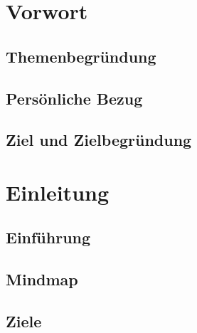 \section{Vorwort}
\subsection{Themenbegründung}


\subsection{Persönliche Bezug}
\subsection{Ziel und Zielbegründung}

\section{Einleitung}
\subsection{Einführung}

\newpage
\subsection{Mindmap}
\subsection{Ziele} \label{introduction}
